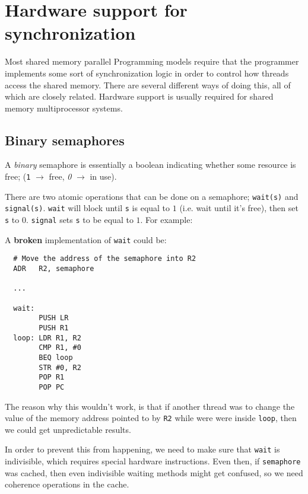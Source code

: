 
\section{Hardware support for synchronization}

Most shared memory parallel Programming models require that the programmer
implements some sort of synchronization logic in order to control how threads
access the shared memory. There are several different ways of doing this, all of
which are closely related. Hardware support is usually required for shared
memory multiprocessor systems.

\subsection{Binary semaphores}

A \textit{binary} semaphore is essentially a boolean indicating whether some
resource is free; (\texttt{1} $\rightarrow$ free, \textit{0} $\rightarrow$ in
use).

There are two atomic operations that can be done on a semaphore;
\texttt{wait(s)} and \texttt{signal(s)}. \texttt{wait} will block until
\texttt{s} is equal to $1$ (i.e. wait until it's free), then set \texttt{s} to
$0$. \texttt{signal} sets \texttt{s} to be equal to $1$. For example:


A \textbf{broken} implementation of \texttt{wait} could be:

\begin{verbatim}
  # Move the address of the semaphore into R2
  ADR   R2, semaphore

  ...

  wait:
        PUSH LR
        PUSH R1
  loop: LDR R1, R2
        CMP R1, #0
        BEQ loop
        STR #0, R2
        POP R1
        POP PC
\end{verbatim}

The reason why this wouldn't work, is that if another thread was to change the
value of the memory address pointed to by \texttt{R2} while were were inside
\texttt{loop}, then we could get unpredictable results.

In order to prevent this from happening, we need to make sure that \texttt{wait}
is indivisible, which requires special hardware instructions. Even then, if
\texttt{semaphore} was cached, then even indivisible waiting methods might get
confused, so we need coherence operations in the cache.

